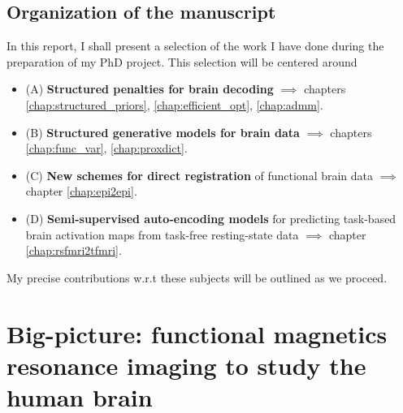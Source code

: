 \section{Organization of the manuscript}
In this report, I shall present a selection of the work I have done during the preparation of my PhD project. This selection will be centered around
\begin{itemize}
\item (A) \textbf{Structured penalties for brain decoding} $\implies$ chapters \ref{chap:structured_priors}, \ref{chap:efficient_opt}, \ref{chap:admm}.
\item (B) \textbf{Structured generative models for brain data} $\implies$ chapters \ref{chap:func_var}, \ref{chap:proxdict}.
\item (C) \textbf{New schemes for direct registration} of functional brain data $\implies$ chapter \ref{chap:epi2epi}.
\item (D) \textbf{Semi-supervised auto-encoding models} for predicting task-based brain activation
  maps from task-free resting-state data $\implies$ chapter \ref{chap:rsfmri2tfmri}.
\end{itemize}
My precise contributions w.r.t these subjects will be outlined  as we proceed.

\chapter{Big-picture: functional magnetics resonance imaging to study the human brain}\label{chap:bigpic}

\minitoc
 
